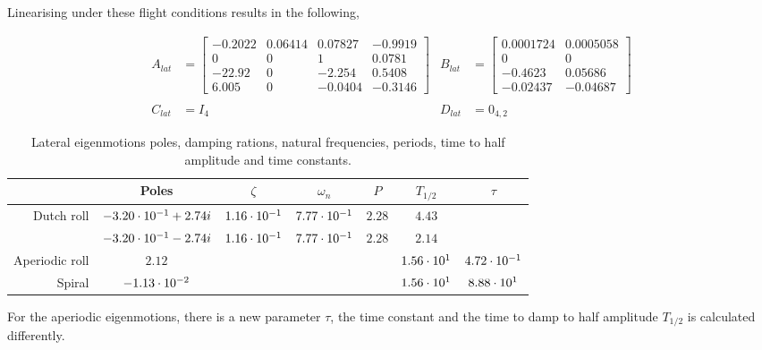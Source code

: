 Linearising under these flight conditions results in the following,

\begin{align*}
    A_{lat}&=\begin{bmatrix}
        -0.2022 & 0.06414 & 0.07827 & -0.9919 \\
              0 &       0 &       1 &  0.0781 \\
         -22.92 &       0 &  -2.254 &  0.5408 \\
          6.005 &       0 & -0.0404 & -0.3146
    \end{bmatrix} &
    B_{lat}&=\begin{bmatrix}
        0.0001724 & 0.0005058 \\
                0 &         0 \\
          -0.4623 &   0.05686 \\
         -0.02437 &  -0.04687 
    \end{bmatrix} \\\\
    C_{lat}&=I_4 &
    D_{lat}&=0_{4,2}
\end{align*}

\begin{table}[h!]
    \centering
    \begin{tabular}{ r | c c c c c c }
                       & Poles                   & $\zeta$        & $\omega_n$     & $P$    & $T_{1/2}$     & $\tau$         \\ \hline \hline
        Dutch roll     & $-3.20\cdot 10^{-1} + 2.74i$ & $1.16\cdot 10^{-1}$ & $7.77\cdot 10^{-1}$ & $2.28$ & $4.43$        &                \\  
                       & $-3.20\cdot 10^{-1} - 2.74i$ & $1.16\cdot 10^{-1}$ & $7.77\cdot 10^{-1}$ & $2.28$ & $2.14$        &                \\ \hline
        Aperiodic roll & $2.12$                  &                &                &        & $1.56\cdot 10^{1}$ & $4.72\cdot 10^{-1}$ \\ \hline 
        Spiral         & $-1.13\cdot 10^{-2}$         &                &                &        & $1.56\cdot 10^{1}$ & $8.88\cdot 10^{1}$
    \end{tabular}
    \caption{Lateral eigenmotions poles, damping rations, natural frequencies, periods, time to half amplitude and time constants.}
\end{table}

For the aperiodic eigenmotions, there is a new parameter $\tau$, the time constant and the time to damp to half amplitude $T_{1/2}$ is calculated differently.

